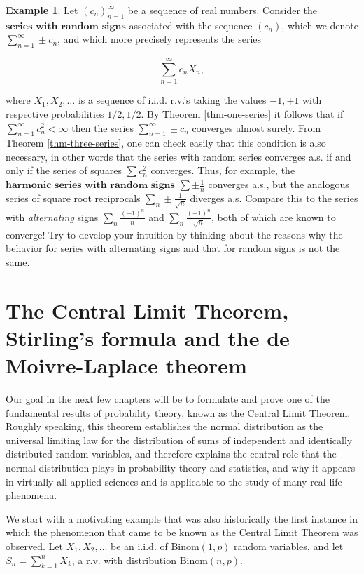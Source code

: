 \documentclass[11pt]{report}
\theoremstyle{plain}
\theoremstyle{definition}
\newtheorem{example}[thm]{Example}
\begin{document}
\begin{example}
Let $(c_n)_{n=1}^\infty$ be a sequence of real
numbers. Consider the
$\textbf{series with random signs}$ associated with
the sequence $(c_n)$, which we denote
$\sum_{n=1}^\infty \pm c_n$, and which more precisely
represents the series

\[
\sum_{n=1}^\infty c_n X_n,
\]

where $X_1, X_2, \ldots$ is a sequence of i.i.d.
r.v.'s taking the values $-1,+1$ with respective
probabilities $1/2,1/2$. By Theorem \ref{thm-one-series}
it follows that if $\sum_{n=1}^\infty c_n^2 < \infty$
then the series $\sum_{n=1}^\infty \pm c_n$ converges
almost surely. From Theorem \ref{thm-three-series}, one
can check easily that this condition is also
necessary, in other words that the series with random
series converges a.s. if and only if the series of
squares $\sum c_n^2$ converges. Thus, for example,
the $\textbf{harmonic series with random signs}$
$\sum \pm \frac{1}{n}$ converges a.s., but the
analogous series of square root reciprocals
$\sum_n \pm \frac{1}{\sqrt{n}}$ diverges a.s. Compare
this to the series with \emph{alternating} signs
$\sum_n \frac{(-1)^n}{n}$ and
$\sum_n \frac{(-1)^n}{\sqrt{n}}$, both of which are
known to converge! Try to develop your intuition by
thinking about the reasons why the behavior for series
with alternating signs and that for random signs is
not the same.
\end{example}

\chapter{The Central Limit Theorem, Stirling’s formula and the de Moivre-Laplace theorem}
Our goal in the next few chapters will be to
formulate and prove one of the fundamental results of
probability theory, known as the Central Limit
Theorem. Roughly speaking, this theorem establishes
the normal distribution as the universal limiting law
for the distribution of sums of independent and
identically distributed random variables, and
therefore explains the central role that the normal
distribution plays in probability theory and
statistics, and why it appears in virtually all
applied sciences and is applicable to the study of
many real-life phenomena.

We start with a motivating example that was also
historically the first instance in which the
phenomenon that came to be known as the Central Limit
Theorem was observed. Let $X_1, X_2, \ldots$ be an
i.i.d. of $\textrm{Binom}(1,p)$ random variables, and
let $S_n = \sum_{k=1}^n X_k$, a r.v. with
distribution $\textrm{Binom}(n,p)$.
\end{document}
